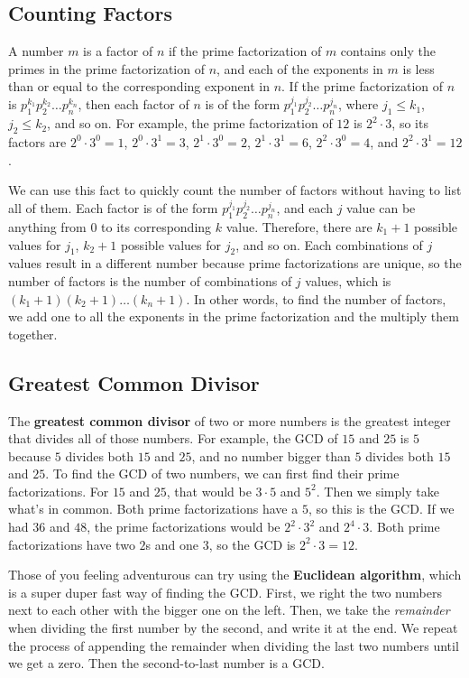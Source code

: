 \documentclass[twocolumn]{article}
\begin{document}
\subsection*{Counting Factors}
A number $m$ is a factor of $n$ if the prime factorization of $m$ contains only the primes
in the prime factorization of $n$, and each of the exponents in $m$ is less than or equal to
the corresponding exponent in $n$.
If the prime factorization of $n$ is $p_1^{k_1} p_2^{k_2} \dots p_n^{k_n}$,
then each factor of $n$ is of the form $p_1^{j_1} p_2^{j_2} \dots p_n^{j_n}$,
where $j_1 \leq k_1$, $j_2 \leq k_2$, and so on.
For example, the prime factorization of $12$ is $2^2 \cdot 3$, so its factors are
$2^0 \cdot 3^0 = 1$, $2^0 \cdot 3^1 = 3$, $2^1 \cdot 3^0 = 2$, $2^1 \cdot 3^1 = 6$,
$2^2 \cdot 3^0 = 4$, and $2^2 \cdot 3^1 = 12$.

We can use this fact to quickly count the number of factors without having to list all of them.
Each factor is of the form $p_1^{j_1} p_2^{j_2} \dots p_n^{j_n}$, and each $j$ value
can be anything from $0$ to its corresponding $k$ value.
Therefore, there are $k_1 + 1$ possible values for $j_1$, $k_2 + 1$ possible values for $j_2$,
and so on.
Each combinations of $j$ values result in a different number because prime factorizations
are unique, so the number of factors is the number of combinations of $j$ values,
which is $(k_1 + 1)(k_2 + 1) \dots (k_n + 1)$.
In other words, to find the number of factors, we add one to all the exponents in the
prime factorization and the multiply them together.

\subsection*{Greatest Common Divisor}
The \textbf{greatest common divisor} of two or more numbers is the greatest integer that
divides all of those numbers.
For example, the GCD of $15$ and $25$ is $5$ because $5$ divides both $15$ and $25$,
and no number bigger than $5$ divides both $15$ and $25$.
To find the GCD of two numbers, we can first find their prime factorizations.
For $15$ and $25$, that would be $3 \cdot 5$ and $5^2$.
Then we simply take what's in common.
Both prime factorizations have a $5$, so this is the GCD.
If we had $36$ and $48$, the prime factorizations would be $2^2 \cdot 3^2$ and $2^4 \cdot 3$.
Both prime factorizations have two $2$s and one $3$, so the GCD is $2^2 \cdot 3 = 12$.

Those of you feeling adventurous can try using the \textbf{Euclidean algorithm},
which is a super duper fast way of finding the GCD.
First, we right the two numbers next to each other with the bigger one on the left.
Then, we take the \emph{remainder} when dividing the first number by the second,
and write it at the end.
We repeat the process of appending the remainder when dividing the last two numbers
until we get a zero.
Then the second-to-last number is a GCD.
\end{document}
